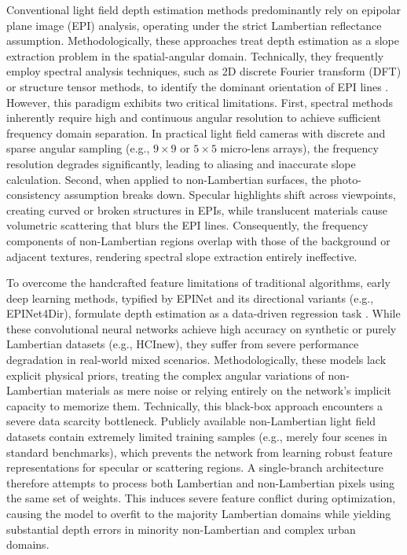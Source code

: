 \documentclass[lettersize,journal]{IEEEtran}
\begin{document}
Conventional light field depth estimation methods predominantly rely on epipolar plane image (EPI) analysis, operating under the strict Lambertian reflectance assumption. Methodologically, these approaches treat depth estimation as a slope extraction problem in the spatial-angular domain. Technically, they frequently employ spectral analysis techniques, such as 2D discrete Fourier transform (DFT) or structure tensor methods, to identify the dominant orientation of EPI lines . However, this paradigm exhibits two critical limitations. First, spectral methods inherently require high and continuous angular resolution to achieve sufficient frequency domain separation. In practical light field cameras with discrete and sparse angular sampling (e.g., $9 \times 9$ or $5 \times 5$ micro-lens arrays), the frequency resolution degrades significantly, leading to aliasing and inaccurate slope calculation. Second, when applied to non-Lambertian surfaces, the photo-consistency assumption breaks down. Specular highlights shift across viewpoints, creating curved or broken structures in EPIs, while translucent materials cause volumetric scattering that blurs the EPI lines. Consequently, the frequency components of non-Lambertian regions overlap with those of the background or adjacent textures, rendering spectral slope extraction entirely ineffective.

To overcome the handcrafted feature limitations of traditional algorithms, early deep learning methods, typified by EPINet and its directional variants (e.g., EPINet4Dir), formulate depth estimation as a data-driven regression task \cite{vaswani2017}. While these convolutional neural networks achieve high accuracy on synthetic or purely Lambertian datasets (e.g., HCInew), they suffer from severe performance degradation in real-world mixed scenarios. Methodologically, these models lack explicit physical priors, treating the complex angular variations of non-Lambertian materials as mere noise or relying entirely on the network's implicit capacity to memorize them. Technically, this black-box approach encounters a severe data scarcity bottleneck. Publicly available non-Lambertian light field datasets contain extremely limited training samples (e.g., merely four scenes in standard benchmarks), which prevents the network from learning robust feature representations for specular or scattering regions. A single-branch architecture therefore attempts to process both Lambertian and non-Lambertian pixels using the same set of weights. This induces severe feature conflict during optimization, causing the model to overfit to the majority Lambertian domains while yielding substantial depth errors in minority non-Lambertian and complex urban domains.
\end{document}
